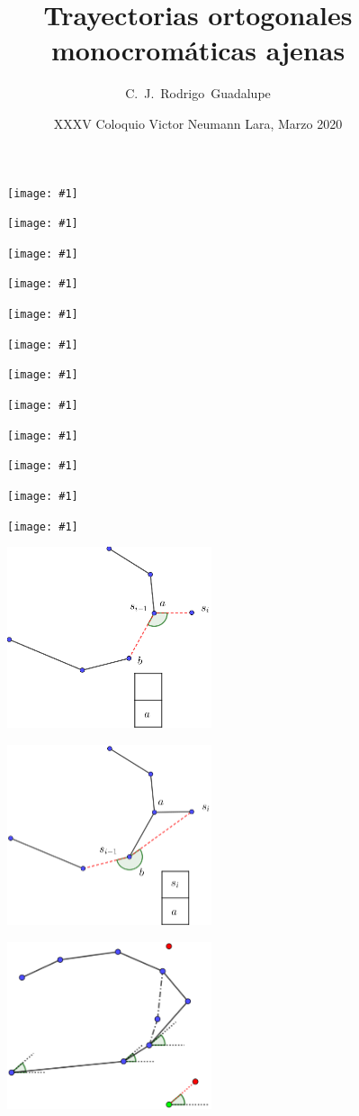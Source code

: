 \documentclass{beamer}
\title[Trayectorias ortogonales monocromáticas ajenas] %
{Trayectorias ortogonales monocromáticas ajenas}
\subtitle{}
\author[Rodrigo Chávez] %
{C.~J.~Rodrigo~Guadalupe\inst{1}}
\institute[VFU] %
{
  \inst{1}%
  Instituto de Matemáticas\\
  Universidad Nacional Autónoma de México

}
\date[VNL 2020] %
{XXXV Coloquio Victor Neumann Lara, Marzo 2020}
\newcommand{\img}[1]{
\begin{frame}
 \begin{figure}[h]
 \texttt{[image: \#1]}
 \end{figure}
\end{frame}
}
\begin{document}
\frame{\titlepage}

\img{A-arreglo}
\img{A-arreglo-2}
\img{A-arreglo-3}
\img{A-algoritmo}
\img{A-algoritmo-2}
\img{A-algoritmo-partir}
\img{A-algoritmo-partir-2}
\img{A-algoritmo-3}
\img{A-dual-ejemplo}
\img{A-dual-ejemplo-2}
\img{A-dual-ejemplo-3}
\img{A-dual-orden}
\begin{frame}
 \begin{figure}[h]
 \includegraphics[width=6cm]{A-giros}
 \end{figure}
\end{frame}
\begin{frame}
 \begin{figure}[h]
 \includegraphics[width=6cm]{A-giros-2}
 \end{figure}
\end{frame}
\begin{frame}
 \begin{figure}[h]
 \includegraphics[width=6cm]{A-paralelas-3}
 \end{figure}
\end{frame}
\end{document}
